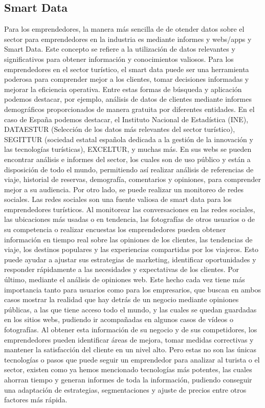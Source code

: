 \documentclass[
  letterpaper,
  DIV=11,
  numbers=noendperiod]{scrreprt}
\begin{document}
\hypertarget{smart-data}{%
\subsection{Smart Data}\label{smart-data}}

Para los emprendedores, la manera más sencilla de de otender datos sobre
el sector para emprendedores en la industria es mediante informes y
webs/apps y Smart Data. Este concepto se refiere a la utilización de
datos relevantes y significativos para obtener información y
conocimientos valiosos. Para los emprendedores en el sector turístico,
el smart data puede ser una herramienta poderosa para comprender mejor a
los clientes, tomar decisiones informadas y mejorar la eficiencia
operativa. Entre estas formas de búsqueda y aplicación podemos destacar,
por ejemplo, análisis de datos de clientes mediante informes
demográficos proporcionados de manera gratuita por diferentes entidades.
En el caso de España podemos destacar, el Instituto Nacional de
Estadística (INE), DATAESTUR (Selección de los datos más relevantes del
sector turístico), SEGITTUR (sociedad estatal española dedicada a la
gestión de la innovación y las tecnologías turísticas), EXCELTUR, y
muchas más. En sus webs se pueden encontrar análisis e informes del
sector, los cuales son de uso público y están a disposición de todo el
mundo, permitiendo así realizar análisis de referencias de viaje,
historial de reservas, demografía, comentarios y opiniones, para
comprender mejor a su audiencia. Por otro lado, se puede realizar un
monitoreo de redes sociales. Las redes sociales son una fuente valiosa
de smart data para los emprendedores turísticos. Al monitorear las
conversaciones en las redes sociales, las ubicaciones más usadas o en
tendencia, las fotografías de otros usuarios o de su competencia o
realizar encuestas los emprendedores pueden obtener información en
tiempo real sobre las opiniones de los clientes, las tendencias de
viaje, los destinos populares y las experiencias compartidas por los
viajeros. Esto puede ayudar a ajustar sus estrategias de marketing,
identificar oportunidades y responder rápidamente a las necesidades y
expectativas de los clientes. Por último, mediante el análisis de
opiniones web. Este hecho cada vez tiene más importancia tanto para
usuarios como para los empresarios, que buscan en ambos casos mostrar la
realidad que hay detrás de un negocio mediante opiniones públicas, a las
que tiene acceso todo el mundo, y las cuales se quedan guardadas en los
sitios webs, pudiendo ir acompañadas en algunos casos de vídeos o
fotografías. Al obtener esta información de su negocio y de sus
competidores, los emprendedores pueden identificar áreas de mejora,
tomar medidas correctivas y mantener la satisfacción del cliente en un
nivel alto. Pero estas no son las únicas tecnologías o pasos que puede
seguir un emprendedor para analizar al turista o el sector, existen como
ya hemos mencionado tecnologías más potentes, las cuales ahorran tiempo
y generan informes de toda la información, pudiendo conseguir una
adaptación de estrategias, segmentaciones y ajuste de precios entre
otros factores más rápida.
\end{document}
